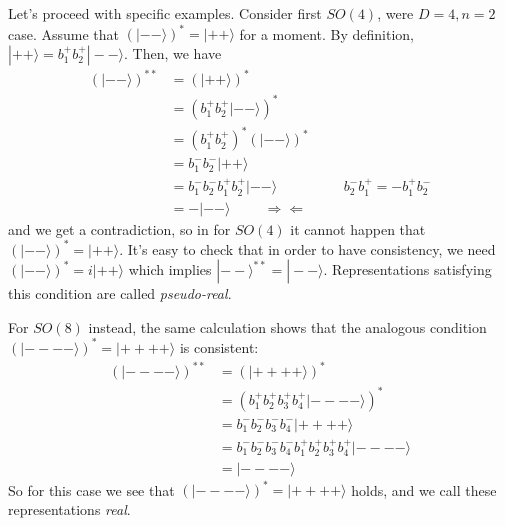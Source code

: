 \documentclass[a4paper,12pt]{article}
\numberwithin{equation}{section}
\numberwithin{exe}{section}
\newcommand{\ket}[1]{| #1 \rangle}
\begin{document}
Let's proceed with specific examples. 
Consider first $SO(4)$, were $D=4, n=2$ case.  Assume that $\left( \ket{--} \right)^*=\ket{++}$ for a moment. By definition, $\ket{++}=b_1^+ b_2^+\ket{--}$. Then, we have
	\begin{align}\label{}
	\left( \ket{--} \right)^{**}&=\left( \ket{++} \right)^* \nonumber \\
	&=\left( b_1^+ b_2^+\ket{--} \right)^* \nonumber \\
	&=\left( b_1^+ b_2^+ \right)^* \left(\ket{--} \right)^* \nonumber \\
	&=b_1^-b_2^- \ket{++} \nonumber \\
	&=b_1^-b_2^- b_1^+ b_2^+ \ket{--}  \hspace{2cm} b_2^-b_1^+=-b_1^+b_2^- \nonumber  \\
	&=- \ket{--}\hspace{1cm} \Rightarrow \Leftarrow \label{cont}
	\end{align}
and we get a contradiction, so in for $SO(4)$ it cannot happen that $\left( \ket{--} \right)^*=\ket{++}$. It's easy to check that in order to have consistency, we need $\left( \ket{--} \right)^*=i\ket{++}  $ which implies $\ket{--}^{**}=\ket{--}$. Representations satisfying this condition are called \textit{pseudo-real}.

For $SO(8)$ instead, the same calculation shows that the analogous condition $\left( \ket{----} \right)^*=\ket{++++}$ is consistent: 
	\begin{align}\label{}
	\left( \ket{----} \right)^{**}&=\left( \ket{++++} \right)^* \nonumber \\
	&=\left( b_1^+ b_2^+ b_3^+ b_4^+\ket{----} \right)^* \nonumber \\
	&= b_1^- b_2^- b_3^- b_4^- \ket{++++}\nonumber \\
	&= b_1^- b_2^- b_3^- b_4^- b_1^+b_2^+ b_3^+ b_4^+\ket{----} \nonumber \\
	&=\ket{----} 
	\end{align}
So for this case we see that $\left( \ket{----} \right)^*=\ket{++++}$ holds, and we call these representations \textit{real}.
\end{document}

